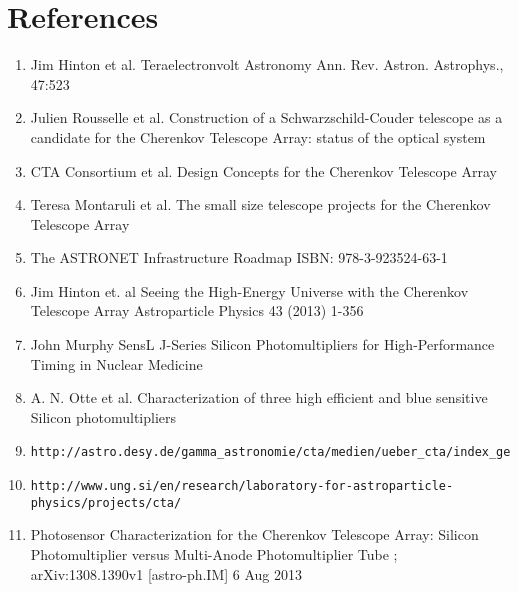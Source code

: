 \documentclass[12pt,article,type=msc,colorback,accentcolor=tud9c]{tudthesis}
\begin{document}
\clearpage
\newpage
\section{\Large References}
\begin{enumerate}
\item Jim Hinton et al. Teraelectronvolt Astronomy Ann. Rev. Astron. Astrophys., 47:523
\item Julien Rousselle et al. Construction of a Schwarzschild-Couder telescope as a candidate for the Cherenkov Telescope Array: status of the optical system
\item CTA Consortium et al. Design Concepts for the Cherenkov Telescope Array
\item Teresa Montaruli et al. The small size telescope projects for the Cherenkov Telescope Array
\item The ASTRONET Infrastructure Roadmap ISBN: 978-3-923524-63-1
\item Jim Hinton et. al Seeing the High-Energy Universe with the Cherenkov Telescope Array Astroparticle Physics 43 (2013) 1-356 
\item John Murphy SensL J-Series Silicon Photomultipliers for High-Performance Timing in Nuclear Medicine 
\item A. N. Otte et al. Characterization of three high efficient and blue sensitive Silicon photomultipliers
\item \begin{verbatim}http://astro.desy.de/gamma_astronomie/cta/medien/ueber_cta/index_ger.html\end{verbatim}
\item \label{ref10}\begin{verbatim}http://www.ung.si/en/research/laboratory-for-astroparticle-physics/projects/cta/\end{verbatim}
\item \label{ref:ref11}Photosensor Characterization for the Cherenkov Telescope Array: Silicon Photomultiplier versus Multi-Anode Photomultiplier Tube ; arXiv:1308.1390v1 [astro-ph.IM] 6 Aug 2013
\end{enumerate}
\end{document}
